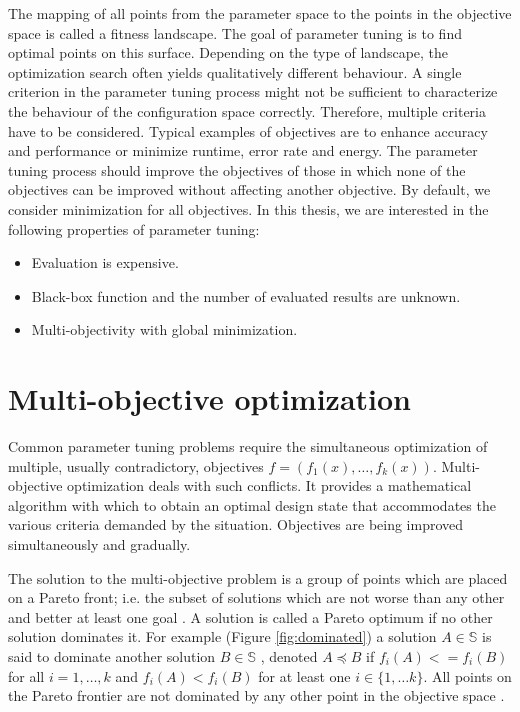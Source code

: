         The mapping of all points from the parameter space to the points in the objective space is called a fitness landscape. The goal of parameter tuning is to find optimal points on this surface. Depending on the type of landscape, the optimization search often yields qualitatively different behaviour.
        A single criterion in the parameter tuning process might not be sufficient to characterize the behaviour of the configuration space correctly. Therefore, multiple criteria have to be considered. Typical examples of objectives are to enhance accuracy and performance or minimize runtime, error rate and energy. The parameter tuning process should improve the objectives of those in which none of the objectives can be improved without affecting another objective. By default, we consider minimization for all objectives. 
        In this thesis, we are interested in the following properties of parameter tuning:
        \begin{itemize}
            \item Evaluation is expensive.
            \item Black-box function and the number of evaluated results are unknown.
            \item Multi-objectivity with global minimization.
        \end{itemize}

    

    \section{Multi-objective optimization}
        Common parameter tuning problems require the simultaneous optimization of multiple, usually contradictory, objectives $f = (f_1(x), \ldots, f_k(x))$. Multi-objective optimization deals with such conflicts. It provides a mathematical algorithm with which to obtain an optimal design state that accommodates the various criteria demanded by the situation. Objectives are being improved simultaneously and gradually.

        The solution to the multi-objective problem is a group of points which are placed on a Pareto front; i.e. the subset of solutions which are not worse than any other and better at least one goal \cite{KrallMD15}. A solution is called a Pareto optimum if no other solution dominates it. For example (Figure \ref{fig:dominated}) a solution $A \in \mathbb{S}$ is said to dominate another solution $B \in \mathbb{S}$ , denoted $A \preceq B$ if $f_i(A)<=f_i(B)$ for all $i=1, \ldots ,k$ and $f_i(A)<f_i(B)$ for at least one $i \in \{1, \ldots k\}$. All points on the Pareto frontier are not dominated by any other point in the objective space \cite{Kaisa0021267}.  

